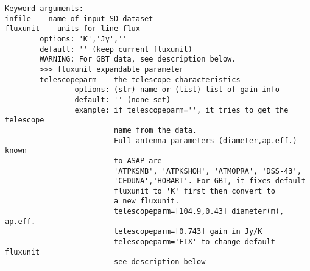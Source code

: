 \begin{verbatim}
Keyword arguments:
infile -- name of input SD dataset
fluxunit -- units for line flux
        options: 'K','Jy',''
        default: '' (keep current fluxunit)
        WARNING: For GBT data, see description below.
        >>> fluxunit expandable parameter
        telescopeparm -- the telescope characteristics
                options: (str) name or (list) list of gain info
                default: '' (none set)
                example: if telescopeparm='', it tries to get the telescope
                         name from the data.
                         Full antenna parameters (diameter,ap.eff.) known
                         to ASAP are
                         'ATPKSMB', 'ATPKSHOH', 'ATMOPRA', 'DSS-43',
                         'CEDUNA','HOBART'. For GBT, it fixes default
                         fluxunit to 'K' first then convert to 
                         a new fluxunit.
                         telescopeparm=[104.9,0.43] diameter(m), ap.eff.
                         telescopeparm=[0.743] gain in Jy/K
                         telescopeparm='FIX' to change default fluxunit
                         see description below


\end{verbatim}
